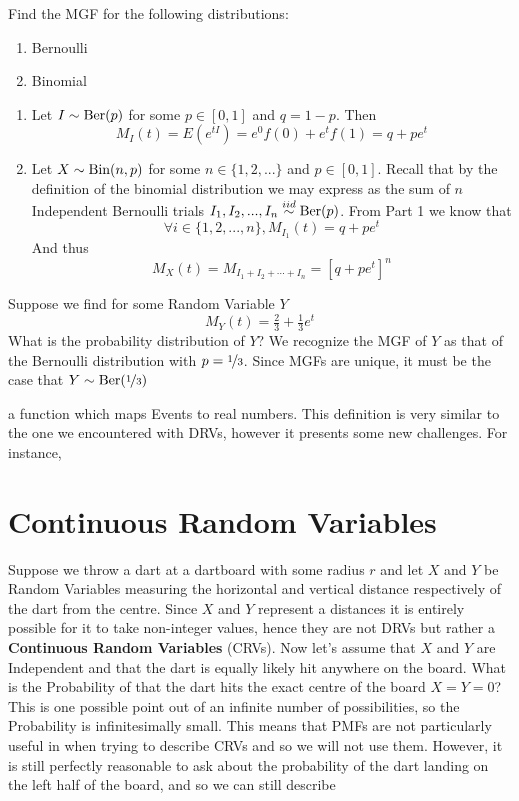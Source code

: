 \documentclass{report}
\begin{document}
\begin{example}
    Find the MGF for the following distributions:
    \begin{enumerate}
        \item Bernoulli
        \item Binomial
    \end{enumerate}
    \solution 
    \begin{enumerate}
        \item Let $I\sim \textup{Ber}(p)$ for some $p\in[0,1]$ and $q=1-p$. Then
        \[
            M_I(t)=E(e^{tI})=e^0 f(0)+ e^t f(1)= q+pe^t
        \]
        \item Let $X\sim\textup{Bin}(n,p)$ for some $n\in\{1,2,...\}$ and $p\in[0,1]$. Recall that by the definition of the binomial distribution we may express as the sum of $n$ Independent Bernoulli trials $I_1,I_2,...,I_n\overset{iid}\sim\textup{Ber}(p)$. From Part 1 we know that
        \[
            \forall i\in\{1,2,...,n\}, M_{I_1}(t)=q+pe^t
        \]
        And thus
        \[
            M_X(t)=M_{I_1+I_2+\cdots+I_n}=\left[q+pe^t\right]^n
        \]
    \end{enumerate}
\end{example}

\begin{example}
        Suppose we find for some Random Variable $Y$
        \[
            M_Y(t)=\tfrac 23 + \tfrac 13 e^t
        \]
        What is the probability distribution of $Y$?
        \solution
        We recognize the MGF of $Y$ as that of the Bernoulli distribution with $p=\nicefrac 13$. Since MGFs are unique, it must be the case that $Y\sim\textup{Ber}(\nicefrac 13)$
\end{example}



a function which maps Events to real numbers. This definition is very similar to the one we encountered with DRVs, however it presents some new challenges. For instance,

\section{Continuous Random Variables}
Suppose we throw a dart at a dartboard with some radius $r$ and let $X$ and $Y$ be Random Variables measuring the horizontal and vertical distance respectively of the dart from the centre. Since $X$ and $Y$ represent a distances it is entirely possible for it to take non-integer values, hence they are not DRVs but rather a \textbf{Continuous Random Variables} (CRVs). Now let's assume that $X$ and $Y$ are Independent and that the dart is equally likely hit anywhere on the board. What is the Probability of that the dart hits the exact centre of the board $X=Y=0$? This is one possible point out of an infinite number of possibilities, so the Probability is infinitesimally small. This means that PMFs are not particularly useful in when trying to describe CRVs and so we will not use them. However, it is still perfectly reasonable to ask about the probability of the dart landing on the left half of the board, and so we can still describe 
\end{document}
